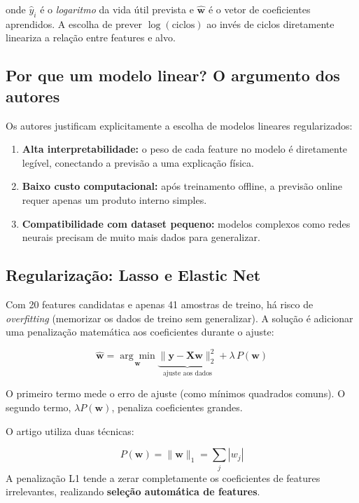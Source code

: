 \documentclass[12pt,a4paper]{article}
\begin{document}
onde $\hat{y}_i$ \'{e} o \textit{logaritmo} da vida \'{u}til prevista e
$\hat{\mathbf{w}}$ \'{e} o vetor de coeficientes aprendidos. A escolha de prever
$\log(\text{ciclos})$ ao inv\'{e}s de ciclos diretamente lineariza a rela\c{c}\~ao
entre features e alvo.

\subsection{Por que um modelo linear? O argumento dos autores}

Os autores justificam explicitamente a escolha de modelos lineares regularizados:

\begin{enumerate}
  \item \textbf{Alta interpretabilidade:} o peso de cada feature no modelo \'{e}
    diretamente leg\'{i}vel, conectando a previs\~ao a uma explica\c{c}\~ao f\'{i}sica.
  \item \textbf{Baixo custo computacional:} ap\'{o}s treinamento offline, a previs\~ao
    online requer apenas um produto interno simples.
  \item \textbf{Compatibilidade com dataset pequeno:} modelos complexos como redes
    neurais precisam de muito mais dados para generalizar.
\end{enumerate}

\subsection{Regulariza\c{c}\~ao: Lasso e Elastic Net}

Com 20 features candidatas e apenas 41 amostras de treino, h\'{a} risco de
\textit{overfitting} (memorizar os dados de treino sem generalizar). A solu\c{c}\~ao
\'{e} adicionar uma penaliza\c{c}\~ao matem\'{a}tica aos coeficientes durante o ajuste:

\begin{equation}
  \hat{\mathbf{w}} = \underset{\mathbf{w}}{\arg\min}
  \underbrace{\|\mathbf{y} - \mathbf{X}\mathbf{w}\|_2^2}_{\text{ajuste aos dados}}
  + \lambda\, P(\mathbf{w})
  \label{eq:regularizacao}
\end{equation}

O primeiro termo mede o erro de ajuste (como m\'{i}nimos quadrados comuns).
O segundo termo, $\lambda P(\mathbf{w})$, penaliza coeficientes grandes.

O artigo utiliza duas t\'{e}cnicas:

\begin{conceito}[Lasso ($L_1$)]
\[P(\mathbf{w}) = \|\mathbf{w}\|_1 = \sum_j |w_j|\]
A penaliza\c{c}\~ao L1 tende a zerar completamente os coeficientes de features
irrelevantes, realizando \textbf{sele\c{c}\~ao autom\'{a}tica de features}.
\end{conceito}
\end{document}
